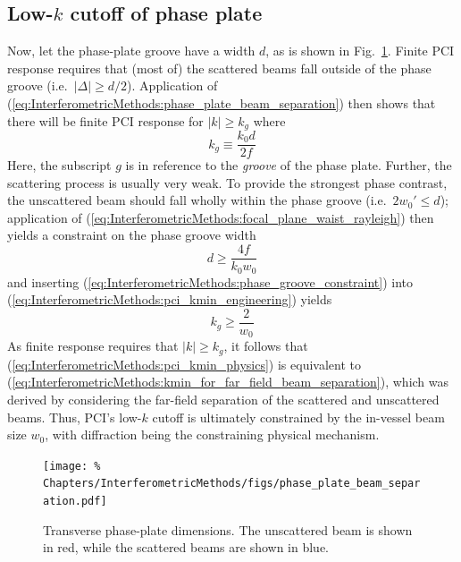 \subsection{Low-$k$ cutoff of phase plate}
Now, let the phase-plate groove have a width $d$, as is shown in
Fig.~\ref{fig:InterferometricMethods:phase_plate_beam_separation}.
Finite PCI response requires that (most of) the scattered beams
fall outside of the phase groove (i.e.\ $|\Delta| \geq d / 2$).
Application of (\ref{eq:InterferometricMethods:phase_plate_beam_separation})
then shows that there will be finite PCI response
for $|k| \geq k_g$ where
\begin{equation}
  k_g \equiv \frac{k_0 d}{2 f}
  \label{eq:InterferometricMethods:pci_kmin_engineering}
\end{equation}
Here, the subscript $g$ is in reference
to the \emph{groove} of the phase plate.
Further, the scattering process is usually very weak.
To provide the strongest phase contrast,
the unscattered beam should fall wholly within the phase groove
(i.e.\ $2 w_0' \leq d$);
application of (\ref{eq:InterferometricMethods:focal_plane_waist_rayleigh})
then yields a constraint on the phase groove width
\begin{equation}
  d \geq \frac{4 f}{k_0 w_0}
  \label{eq:InterferometricMethods:phase_groove_constraint}
\end{equation}
and inserting (\ref{eq:InterferometricMethods:phase_groove_constraint}) into
(\ref{eq:InterferometricMethods:pci_kmin_engineering}) yields
\begin{equation}
  k_g \geq \frac{2}{w_0}
  \label{eq:InterferometricMethods:pci_kmin_physics}
\end{equation}
As finite response requires that $|k| \geq k_g$, it follows that
(\ref{eq:InterferometricMethods:pci_kmin_physics}) is equivalent to
(\ref{eq:InterferometricMethods:kmin_for_far_field_beam_separation}),
which was derived by considering the far-field separation
of the scattered and unscattered beams.
Thus, PCI's low-$k$ cutoff
is ultimately constrained by the in-vessel beam size $w_0$,
with diffraction being the constraining physical mechanism.

\begin{figure}
  \centering
  \texttt{[image: \%
    Chapters/InterferometricMethods/figs/phase\_plate\_beam\_separation.pdf]}
  \caption[Transverse phase-plate dimensions]{%
    Transverse phase-plate dimensions.
    The unscattered beam is shown in red, while
    the scattered beams are shown in blue.}
  \label{fig:InterferometricMethods:phase_plate_beam_separation}
\end{figure}


